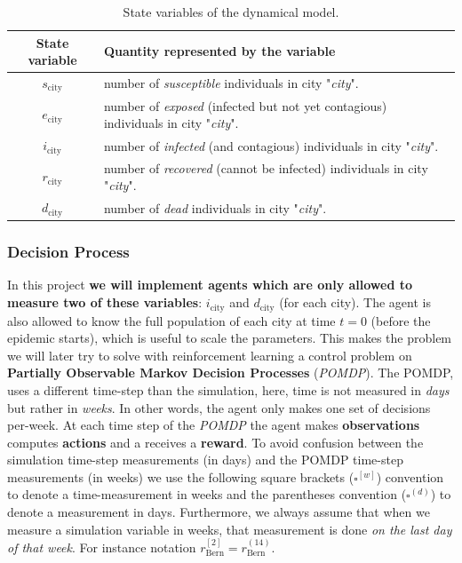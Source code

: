 \documentclass[10pt]{article}
\begin{document}
\begin{table}[ht]

  \begin{center}
    \begin{tabular}{||c | l ||} 
    \hline
    State variable & Quantity represented by the variable  \\ [0.5ex] 
    \hline\hline
    $s_\text{city}$ & number of \textit{susceptible} individuals in city "\textit{city}".  \\
    \hline
    $e_\text{city}$ & number of \textit{exposed} (infected but not yet contagious) individuals in city "\textit{city}". \\
    \hline
    $i_\text{city}$& number of \textit{infected} (and contagious) individuals in city "\textit{city}". \\
    \hline
    $r_\text{city}$ & number of \textit{recovered} (cannot be infected) individuals in city "\textit{city}".  \\
    \hline
    $d_\text{city}$ & number of \textit{dead} individuals in city "\textit{city}". \\ 
    \hline
    \end{tabular}
    \end{center}
    \caption{State variables of the dynamical model.}
    \label{table:states}
\end{table}

\subsubsection*{Decision Process}
In this project \textbf{we will implement agents which are only allowed to measure two of these variables}: $i_\text{city}$ and $d_\text{city}$ (for each city). The agent is also allowed to know the full population of each city at time $t=0$ (before the epidemic starts), which is useful to scale the parameters. 
This makes the problem we will later try to solve with reinforcement learning a control problem on \textbf{Partially Observable Markov Decision Processes} (\textit{POMDP}). The POMDP, uses a different time-step than the simulation, here, time is not measured in \textit{days} but rather in \textit{weeks}. 
In other words, the agent only makes one set of decisions per-week.  At each time step of the \textit{POMDP} the agent makes \textbf{observations} computes \textbf{actions} and a receives a \textbf{reward}. To avoid confusion between the simulation time-step measurements (in days) and the POMDP time-step measurements (in weeks) we use the following square brackets ($\square^{[w]}$) convention to denote a time-measurement in weeks and the parentheses convention ($\square^{(d)}$) to denote a measurement in days. 
Furthermore, we always assume that when we measure a simulation variable in weeks, that measurement is done \textit{on the last day of that week}. For instance notation $r_\text{Bern}^{[2]} = r_\text{Bern}^{(14)}$.
\end{document}
